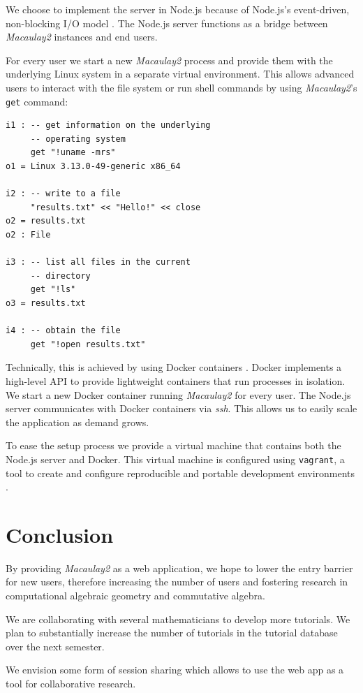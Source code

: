\documentclass[twocolumn]{article}
\def\M2{{\it Macaulay2}}
\begin{document}
We choose to implement the server in Node.js
because of Node.js's event-driven, non-blocking I/O model \cite{nodejs}.
The Node.js server functions as a bridge between \M2 instances and end users.

For every user we start a new \M2 process and
provide them with the underlying Linux system in a separate virtual environment.
This allows advanced users to
interact with the file system or run shell commands by using \M2's {\tt get} 
command:

\begin{verbatim}
i1 : -- get information on the underlying 
     -- operating system
     get "!uname -mrs" 
o1 = Linux 3.13.0-49-generic x86_64

i2 : -- write to a file     
     "results.txt" << "Hello!" << close
o2 = results.txt
o2 : File

i3 : -- list all files in the current 
     -- directory
     get "!ls"
o3 = results.txt

i4 : -- obtain the file
     get "!open results.txt"
\end{verbatim}

Technically, this is achieved by using Docker containers \cite{docker}. Docker implements
a high-level API to provide lightweight containers that run processes in isolation.
We start a new Docker container running \M2 for every user. The Node.js
server communicates with Docker containers via {\it ssh}. This allows us to easily
scale the application as demand grows.

To ease the setup process we provide a virtual machine that contains both the Node.js server
and Docker. This virtual machine is configured using {\tt vagrant}, a tool to create and
configure reproducible and portable development environments \cite{vagrant}.

\section{Conclusion}

By providing \M2 as a web application, we hope to lower the
 entry barrier for new users, therefore increasing the number 
 of users and fostering research in computational algebraic geometry and commutative algebra. 


We are collaborating with several mathematicians to develop more tutorials.
We plan to substantially increase the number of tutorials in the tutorial database over the next semester.


We envision some form of session sharing which allows to use the web app as a tool for collaborative research.
\end{document}
